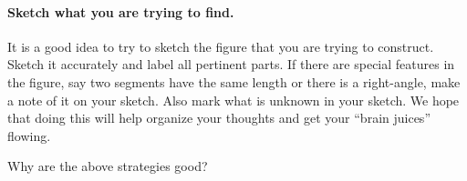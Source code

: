 \paragraph{Sketch what you are trying to find.} 
It is a good idea to try to sketch the figure that you are trying to
construct. Sketch it accurately and label all pertinent parts. If
there are special features in the figure, say two segments have the
same length or there is a right-angle, make a note of it on your
sketch. Also mark what is unknown in your sketch. We hope that doing
this will help organize your thoughts and get your ``brain juices''
flowing.

\begin{question} Why are the above strategies good?
\end{question}
\QM


